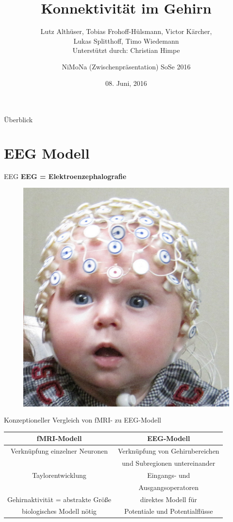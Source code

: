 \documentclass{beamer}
\author{NiMoNa (Zwischenpräsentation) SoSe 2016}
\title{Konnektivität im Gehirn}
\subtitle{Lutz Althüser, Tobias Frohoff-Hülsmann, Victor Kärcher,\\ Lukas Splitthoff, Timo Wiedemann\\ \vspace{0.25cm} Unterstützt durch: Christian Himpe}
\date[08.06.2016]{08. Juni, 2016}
\begin{document}
\begin{frame}[plain]
	  \maketitle
\end{frame}

\begin{frame}{Überblick}

	  \tableofcontents
\end{frame}

\section{EEG Modell}
\begin{frame}{EEG}
\textbf{EEG = Elektroenzephalografie}
\begin{figure}
\centering
\includegraphics[scale=0.3]{res/EEGbaby.png}
\end{figure}
\end{frame}

\begin{frame}{Konzeptioneller Vergleich von fMRI- zu EEG-Modell}
\begin{tabular}{| c | c |}
\hline
\textbf{fMRI-Modell} & \textbf{EEG-Modell} \\
\hline
Verknüpfung einzelner Neuronen & Verknüpfung von Gehirnbereichen \\
&  und Subregionen untereinander \\
\hline
Taylorentwicklung & Eingangs- und \\
&  Ausgangsoperatoren \\
\hline
Gehirnaktivität = abstrakte Größe & direktes Modell für \\
biologisches Modell nötig & Potentiale und Potentialflüsse\\
\hline
\end{tabular}
\end{frame}
\end{document}
